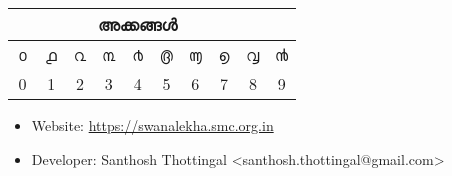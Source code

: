 \documentclass[a4paper]{article}
\makeatletter
\def\en{\color{black!80}\normalsize\En}
\def\at{\expandafter\@gobble\string\@}
\makeatother
\begin{document}
\begin{tabular}{|c|c|c|c|c|c|c|c|c|c|}

\multicolumn{9}{c}{അക്കങ്ങൾ}\\
\hline
൦ & ൧ & ൨ & ൩ & ൪ & ൫  & ൬  & ൭  & ൮ & ൯  \\
\en \at0 & \en \at1 & \en \at2 & \en \at3 & \en \at4 & \en \at5 & \en \at6 & \en \at7 & \en \at8 & \en \at9 \\
\hline
\end{tabular} 

\begin{itemize}
\item Website: \url{https://swanalekha.smc.org.in}
\item Developer: Santhosh Thottingal <santhosh.thottingal@gmail.com>
\end{itemize}
\end{document}
